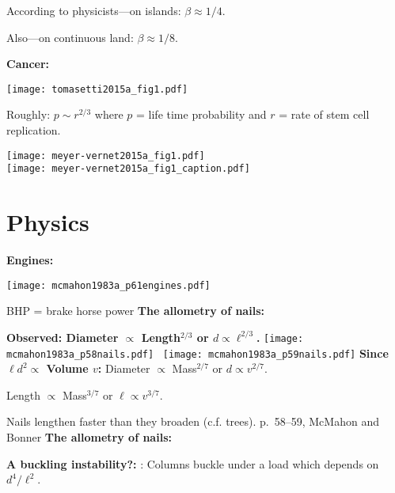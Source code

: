       According to physicists---on islands: $\beta \approx 1/4$.
     
      Also---on continuous land: $\beta \approx 1/8$.
  
  \textbf{Cancer:}


  \begin{center}
    \texttt{[image: tomasetti2015a\_fig1.pdf]}
  \end{center}

  Roughly:
  $
  p 
  \sim
  r^{2/3}
  $
  where
  $p$ = life time probability 
  and
  $r$ = rate of stem cell replication.
  
  

  \texttt{[image: meyer-vernet2015a\_fig1.pdf]}\\
  \texttt{[image: meyer-vernet2015a\_fig1\_caption.pdf]}

\section{Physics}
  \textbf{Engines:}

  \texttt{[image: mcmahon1983a\_p61engines.pdf]}
  
  \tiny{BHP = brake horse power}
  \small
  \textbf{The allometry of nails:}

  \textbf{Observed: Diameter $\propto$ Length$^{2/3}$ or $d \propto \ell^{2/3}$.}
    \texttt{[image: mcmahon1983a\_p58nails.pdf]}
    \
    \texttt{[image: mcmahon1983a\_p59nails.pdf]}
  \textbf{Since $\ell d^2 \propto$ Volume $v$:}
      Diameter $\propto$ {Mass$^{2/7}$ or $d \propto v^{2/7}$.}
     
      Length $\propto$ {Mass$^{3/7}$ or $\ell \propto v^{3/7}$.}
     
      Nails lengthen faster than they broaden (c.f. trees).
  \small{p.\ 58--59, McMahon and Bonner\cite{mcmahon1983a}}
  \textbf{The allometry of nails:}

  \textbf{A buckling instability?:}
      : 
      Columns buckle under a load which depends on $d^4/\ell^2$.
    
